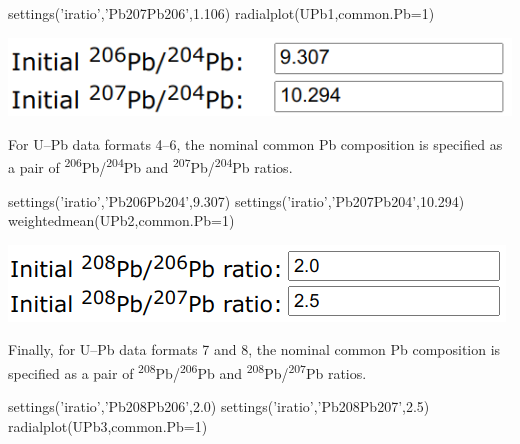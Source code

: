 \begin{refsection}
\begin{enumerate}
\begin{enumerate}
\begin{script}
settings('iratio','Pb207Pb206',1.106)
radialplot(UPb1,common.Pb=1)
\end{script}

  \noindent\begin{minipage}[t]{.4\linewidth}
  \strut\vspace*{-\baselineskip}\newline
  \includegraphics[width=\linewidth]{../figures/initialPb764.png}
  \end{minipage}
  \begin{minipage}[t]{.6\linewidth}
    For U--Pb data formats 4--6, the nominal common Pb composition is specified
    as a pair of \textsuperscript{206}Pb/\textsuperscript{204}Pb and 
    \textsuperscript{207}Pb/\textsuperscript{204}Pb ratios.\\
  \end{minipage}

\begin{script}
settings('iratio','Pb206Pb204',9.307)
settings('iratio','Pb207Pb204',10.294)
weightedmean(UPb2,common.Pb=1)
\end{script}

  \noindent\begin{minipage}[t]{.42\linewidth}
  \strut\vspace*{-\baselineskip}\newline
  \includegraphics[width=\linewidth]{../figures/initialPb876.png}
  \end{minipage}
  \begin{minipage}[t]{.58\linewidth}
    Finally, for U--Pb data formats 7 and 8, the nominal common Pb
    composition is specified as a pair of
    \textsuperscript{208}Pb/\textsuperscript{206}Pb and
    \textsuperscript{208}Pb/\textsuperscript{207}Pb ratios.\\
  \end{minipage}

\begin{script}
settings('iratio','Pb208Pb206',2.0)
settings('iratio','Pb208Pb207',2.5)
radialplot(UPb3,common.Pb=1)
\end{script}


\end{enumerate}
\end{enumerate}
\end{refsection}
